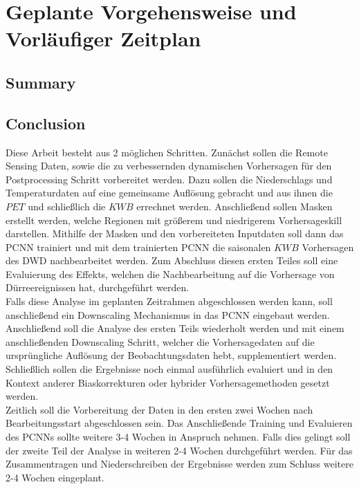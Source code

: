 \documentclass[ba-lentz.tex]{subfile}
\begin{document}
{\let\clearpage\relax \chapter{Geplante Vorgehensweise und Vorläufiger Zeitplan}}\label{summary_conclusion}

\section{Summary}\label{summary}

\section{Conclusion}\label{conclusion}

Diese Arbeit besteht aus 2 möglichen Schritten.
Zunächst sollen die Remote Sensing Daten, sowie die zu verbessernden dynamischen Vorhersagen für den Postprocessing Schritt vorbereitet werden.
Dazu sollen die Niederschlags und Temperaturdaten auf eine gemeinsame Auflösung gebracht und aus ihnen die $PET$ und schließlich die $KWB$ errechnet werden.
Anschließend sollen Masken erstellt werden, welche Regionen mit größerem und niedrigerem Vorhersageskill darstellen.
Mithilfe der Masken und den vorbereiteten Inputdaten soll dann das PCNN trainiert und mit dem trainierten PCNN die saisonalen $KWB$ Vorhersagen des DWD nachbearbeitet werden.
Zum Abschluss diesen ersten Teiles soll eine Evaluierung des Effekts, welchen die Nachbearbeitung auf die Vorhersage von Dürreereignissen hat, durchgeführt werden. \\
Falls diese Analyse im geplanten Zeitrahmen abgeschlossen werden kann, soll anschließend ein Downscaling Mechanismus in das PCNN eingebaut werden.
Anschließend soll die Analyse des ersten Teils wiederholt werden und mit einem anschließenden Downscaling Schritt, welcher die Vorhersagedaten auf die ursprüngliche Auflösung der Beobachtungsdaten hebt, supplementiert werden.
Schließlich sollen die Ergebnisse noch einmal ausführlich evaluiert und in den Kontext anderer Biaskorrekturen oder hybrider Vorhersagemethoden gesetzt werden. \\
Zeitlich soll die Vorbereitung der Daten in den ersten zwei Wochen nach Bearbeitungsstart abgeschlossen sein.
Das Anschließende Training und Evaluieren des PCNNs sollte weitere 3-4 Wochen in Anspruch nehmen.
Falls dies gelingt soll der zweite Teil der Analyse in weiteren 2-4 Wochen durchgeführt werden.
Für das Zusammentragen und Niederschreiben der Ergebnisse werden zum Schluss weitere 2-4 Wochen eingeplant.
\end{document}

